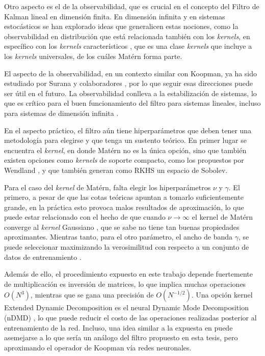 Otro aspecto es el de la observabilidad, que es crucial en el concepto del Filtro de Kalman lineal en dimensión finita. En dimensión infinita y en sistemas estocásticos se han explorado ideas que generalicen estas nociones, como la observabilidad en distribución \cite{Massiani2024Data-DrivenSystems} que está relacionada también con los \textit{kernels}, en específico con los \textit{kernels} característicos \cite{Sriperumbudur2010OnMeasures, Sriperumbudur2011UniversalityMeasures}, que es una clase \textit{kernels} que incluye a los \textit{kernels} universales, de los cuáles Matérn forma parte.

El aspecto de la observabilidad, en un contexto similar con Koopman, ya ha sido estudiado por Surana y colaboradores \cite{Surana2016LinearFramework}, por lo que seguir esas direcciones puede ser útil en el futuro. La observabilidad conlleva a la estabilización de sistemas, lo que es crítico para el buen funcionamiento del filtro para sistemas lineales, incluso para sistemas de dimensión infinita \cite{Afshar2024ExtendedSystems}.

En el aspecto práctico, el filtro aún tiene hiperparámetros que deben tener una metodología para elegirse y que tenga un sustento teórico. En primer lugar se encuentra el \textit{kernel}, en donde Matérn no es la única opción, sino que también existen opciones como \textit{kernels} de soporte compacto, como los propuestos por Wendland \cite{Wendland1995PiecewiseDegree}, y que también generan como RKHS un espacio de Sobolev.

Para el caso del \textit{kernel} de Matérn, falta elegir los hiperparámetros $\nu$ y $\gamma$. El primero, a pesar de que las cotas teóricas apuntan a tomarlo suficientemente grande, en la práctica esto provoca malos resultados de aproximación, lo que puede estar relacionado con el hecho de que cuando $\nu \to \infty$ el kernel de Matérn converge al \textit{kernel} Gaussiano \cite{Rasmussen2005GaussianLearning}, que se sabe no tiene tan buenas propiedades aproximantes. Mientras tanto, para el otro parámetro, el ancho de banda $\gamma$, se puede seleccionar maximizando la verosimilitud con respecto a un conjunto de datos de entrenamiento \cite{Rasmussen2005GaussianLearning}.

Además de ello, el procedimiento expuesto en este trabajo depende fuertemente de multiplicación es inversión de matrices, lo que implica muchas operaciones $O(N^3)$, mientras que se gana una precisión de $O(N^{-1/2})$. Una opción kernel Extended Dynamic Decomposition es el neural Dynamic Mode Decomposition (nDMD) \cite{Xiong2024KoopmanEquations, Frion2023LeveragingData, Terao2021ExtendedEquations}, lo que puede reducir el costo de las operaciones realizadas posterior al entrenamiento de la red. Incluso, una idea similar a la expuesta en \cite{Li2022Data-DrivenNetworks, Liu2024NeuralSystems} puede asemejarse a lo que sería un análogo del filtro propuesto en esta tesis, pero aproximando el operador de Koopman vía redes neuronales. 

